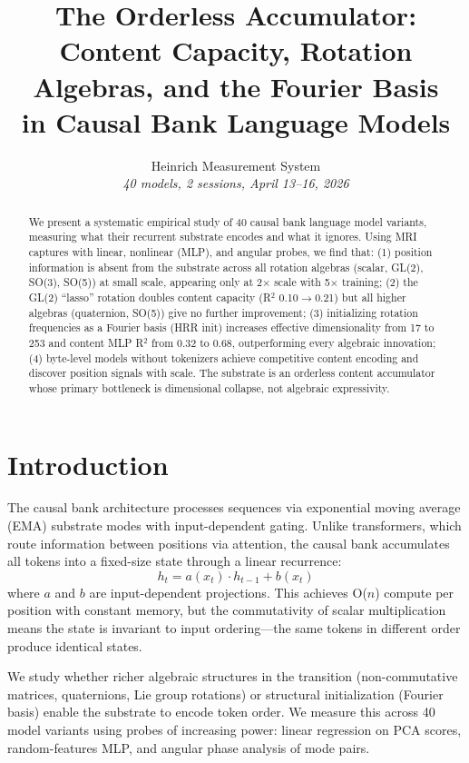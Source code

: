 \documentclass[11pt,a4paper]{article}
\title{The Orderless Accumulator:\\Content Capacity, Rotation Algebras, and the Fourier Basis\\in Causal Bank Language Models}
\author{Heinrich Measurement System \\ \textit{40 models, 2 sessions, April 13--16, 2026}}
\date{}
\begin{document}
\maketitle

\begin{abstract}
We present a systematic empirical study of 40 causal bank language model variants, measuring what their recurrent substrate encodes and what it ignores. Using MRI captures with linear, nonlinear (MLP), and angular probes, we find that: (1) position information is absent from the substrate across all rotation algebras (scalar, GL(2), SO(3), SO(5)) at small scale, appearing only at 2$\times$ scale with 5$\times$ training; (2) the GL(2) ``lasso'' rotation doubles content capacity (R$^2$ 0.10$\to$0.21) but all higher algebras (quaternion, SO(5)) give no further improvement; (3) initializing rotation frequencies as a Fourier basis (HRR init) increases effective dimensionality from 17 to 253 and content MLP R$^2$ from 0.32 to 0.68, outperforming every algebraic innovation; (4) byte-level models without tokenizers achieve competitive content encoding and discover position signals with scale. The substrate is an orderless content accumulator whose primary bottleneck is dimensional collapse, not algebraic expressivity.
\end{abstract}

\section{Introduction}

The causal bank architecture processes sequences via exponential moving average (EMA) substrate modes with input-dependent gating. Unlike transformers, which route information between positions via attention, the causal bank accumulates all tokens into a fixed-size state through a linear recurrence:
\begin{equation}
h_t = a(x_t) \cdot h_{t-1} + b(x_t)
\end{equation}
where $a$ and $b$ are input-dependent projections. This achieves O($n$) compute per position with constant memory, but the commutativity of scalar multiplication means the state is invariant to input ordering---the same tokens in different order produce identical states.

We study whether richer algebraic structures in the transition (non-commutative matrices, quaternions, Lie group rotations) or structural initialization (Fourier basis) enable the substrate to encode token order. We measure this across 40 model variants using probes of increasing power: linear regression on PCA scores, random-features MLP, and angular phase analysis of mode pairs.
\end{document}
